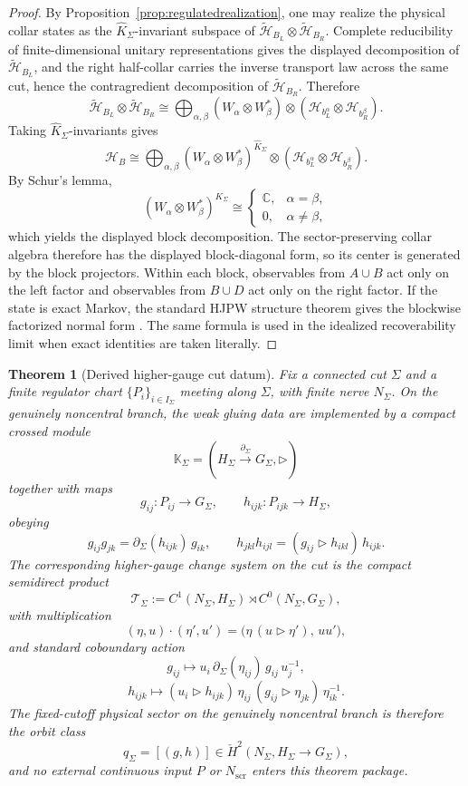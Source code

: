 \documentclass[11pt]{article}
\newtheorem{theorem}{Theorem}[section]
\begin{document}
\begin{proof}
By Proposition~\ref{prop:regulatedrealization}, one may realize the physical collar states as the \(\widehat K_\Sigma\)-invariant subspace of \(\tilde{\mathcal H}_{B_L}\otimes \tilde{\mathcal H}_{B_R}\). Complete reducibility of finite-dimensional unitary representations gives the displayed decomposition of \(\tilde{\mathcal H}_{B_L}\), and the right half-collar carries the inverse transport law across the same cut, hence the contragredient decomposition of \(\tilde{\mathcal H}_{B_R}\). Therefore
\[
\tilde{\mathcal H}_{B_L}\otimes \tilde{\mathcal H}_{B_R}
\cong
\bigoplus_{\alpha,\beta}
(W_\alpha\otimes W_\beta^*)\otimes
(\mathcal H_{b_L^\alpha}\otimes \mathcal H_{b_R^\beta}).
\]
Taking \(\widehat K_\Sigma\)-invariants gives
\[
\mathcal H_B
\cong
\bigoplus_{\alpha,\beta}
(W_\alpha\otimes W_\beta^*)^{\widehat K_\Sigma}\otimes
(\mathcal H_{b_L^\alpha}\otimes \mathcal H_{b_R^\beta}).
\]
By Schur's lemma,
\[
(W_\alpha\otimes W_\beta^*)^{\widehat K_\Sigma}
\cong
\begin{cases}
\mathbb C, & \alpha=\beta,\\
0, & \alpha\neq \beta,
\end{cases}
\]
which yields the displayed block decomposition. The sector-preserving collar algebra therefore has the displayed block-diagonal form, so its center is generated by the block projectors. Within each block, observables from \(A\cup B\) act only on the left factor and observables from \(B\cup D\) act only on the right factor. If the state is exact Markov, the standard HJPW structure theorem gives the blockwise factorized normal form \cite{hjpw04}. The same formula is used in the idealized recoverability limit when exact identities are taken literally.
\end{proof}

\begin{theorem}[Derived higher-gauge cut datum]\label{thm:hgdatum}
Fix a connected cut \(\Sigma\) and a finite regulator chart \(\{P_i\}_{i\in I_\Sigma}\) meeting along \(\Sigma\), with finite nerve \(N_\Sigma\). On the genuinely noncentral branch, the weak gluing data are implemented by a compact crossed module
\[
\mathbb K_\Sigma=(H_\Sigma\xrightarrow{\partial_\Sigma}G_\Sigma,\triangleright)
\]
together with maps
\[
g_{ij}:P_{ij}\to G_\Sigma,
\qquad
h_{ijk}:P_{ijk}\to H_\Sigma,
\]
obeying
\[
g_{ij}g_{jk}=\partial_\Sigma(h_{ijk})\,g_{ik},
\qquad
h_{jkl}h_{ijl}=(g_{ij}\triangleright h_{ikl})\,h_{ijk}.
\]
The corresponding higher-gauge change system on the cut is the compact semidirect product
\[
\mathcal T_\Sigma:=C^1(N_\Sigma,H_\Sigma)\rtimes C^0(N_\Sigma,G_\Sigma),
\]
with multiplication
\[
(\eta,u)\cdot(\eta',u')
=
\bigl(\eta\,(u\triangleright \eta'),\,uu'\bigr),
\]
and standard coboundary action
\[
g_{ij}\mapsto u_i\,\partial_\Sigma(\eta_{ij})\,g_{ij}\,u_j^{-1},
\]
\[
h_{ijk}\mapsto
(u_i\triangleright h_{ijk})\,
\eta_{ij}\,
(g_{ij}\triangleright \eta_{jk})\,
\eta_{ik}^{-1}.
\]
The fixed-cutoff physical sector on the genuinely noncentral branch is therefore the orbit class
\[
q_\Sigma=[(g,h)]\in \check H^2(N_\Sigma,H_\Sigma\to G_\Sigma),
\]
and no external continuous input \(P\) or \(N_{\mathrm{scr}}\) enters this theorem package.
\end{theorem}
\end{document}
